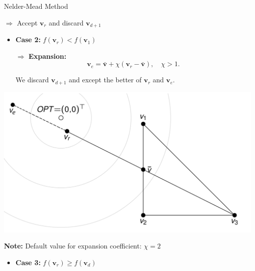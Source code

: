 \documentclass[11pt,compress,t,notes=noshow, xcolor=table]{beamer}
\begin{document}
\begin{vbframe}{Nelder-Mead Method}
\begin{enumerate}
\begin{itemize}
        \medskip

        $\Rightarrow$ Accept $\mathbf{v}_r$ and discard $\mathbf{v}_{d + 1}$
\end{itemize}

\medskip

\begin{minipage}{0.57\textwidth}
\begin{itemize}
    \small
    \item \textbf{Case 2:} $f(\mathbf{v}_r) < f(\mathbf{v}_1)$

        \medskip

        $\Rightarrow$ \textbf{Expansion:} 
        \begin{equation*}
            \mathbf{v}_e = \bar{\mathbf{v}} + \chi (\mathbf{v}_{r} - \bar{\mathbf{v}}), \quad \chi > 1.
        \end{equation*}
    
        We discard $\mathbf{v}_{d + 1}$ and except the better of $\mathbf{v}_r$ and $\mathbf{v}_e$.
\end{itemize}
\end{minipage}
\begin{minipage}{0.35\textwidth}
    \begin{center}
        \includegraphics[width = 1\linewidth]{figure_man/Nelder06.png}
    \end{center}
\end{minipage}

\vspace{\baselineskip}

\textbf{Note:} Default value for expansion coefficient: $\chi = 2$

\framebreak

\begin{itemize}
    \small
    \item \textbf{Case 3:} $f(\mathbf{v}_r) \ge f(\mathbf{v}_d)$
        

\end{itemize}
\end{enumerate}
\end{vbframe}
\end{document}
